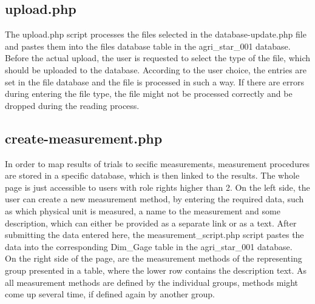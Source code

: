 \subsection{upload.php}
The upload.php script processes the files selected in the database-update.php file and pastes them into the files database table in the agri\_star\_001 database. Before the actual upload, 
the user is requested to select the type of the file, which should be uploaded to the database. According to the user choice, the entries are set in the file database and the file is processed 
in such a way. If there are errors during entering the file type, the file might not be processed correctly and be dropped during the reading process.

\subsection{create-measurement.php}
In order to map results of trials to secific measurements, measurement procedures are stored in a specific database, which is then linked to the results. The whole page is just accessible to users with 
role rights higher than 2. On the left side, the user can create a new measurement method, by entering the required data, such as which physical unit is measured, a name to the measurement and some 
description, which can either be provided as a separate link or as a text. After submitting the data entered here, the measurement\_script.php script pastes the data into the corresponding Dim\_Gage 
table in the agri\_star\_001 database.\\
On the right side of the page, are the measurement methods of the representing group presented in a table, where the lower row contains the description text. As all measurement methods are defined by 
the individual groups, methods might come up several time, if defined again by another group.
